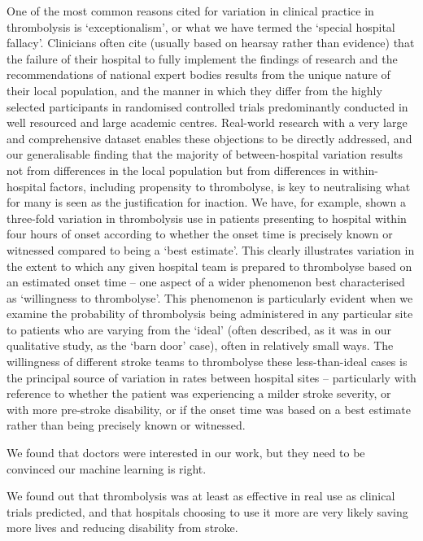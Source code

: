 One of the most common reasons cited for variation in clinical practice in thrombolysis is ‘exceptionalism’, or what we have termed the ‘special hospital fallacy’. Clinicians often cite (usually based on hearsay rather than evidence) that the failure of their hospital to fully implement the findings of research and the recommendations of national expert bodies results from the unique nature of their local population, and the manner in which they differ from the highly selected participants in randomised controlled trials predominantly conducted in well resourced and large academic centres. Real-world research with a very large and comprehensive dataset enables these objections to be directly addressed, and our generalisable finding that the majority of between-hospital variation results not from differences in the local population but from differences in within-hospital factors, including propensity to thrombolyse, is key to neutralising what for many is seen as the justification for inaction. We have, for example, shown a three-fold variation in thrombolysis use in patients presenting to hospital within four hours of onset according to whether the onset time is precisely known or witnessed compared to being a ‘best estimate’. This clearly illustrates variation in the extent to which any given hospital team is prepared to thrombolyse based on an estimated onset time – one aspect of a wider phenomenon best characterised as ‘willingness to thrombolyse’. This phenomenon is particularly evident when we examine the probability of thrombolysis being administered in any particular site to patients who are varying from the ‘ideal’ (often described, as it was in our qualitative study, as the ‘barn door’ case), often in relatively small ways. The willingness of different stroke teams to thrombolyse these less-than-ideal cases is the principal source of variation in rates between hospital sites – particularly with reference to whether the patient was experiencing a milder stroke severity, or with more pre-stroke disability, or if the onset time was based on a best estimate rather than being precisely known or witnessed. 

We found that doctors were interested in our work, but they need to be convinced our machine learning is right. 

We found out that thrombolysis was at least as effective in real use as clinical trials predicted, and that hospitals choosing to use it more are very likely saving more lives and reducing disability from stroke. 

